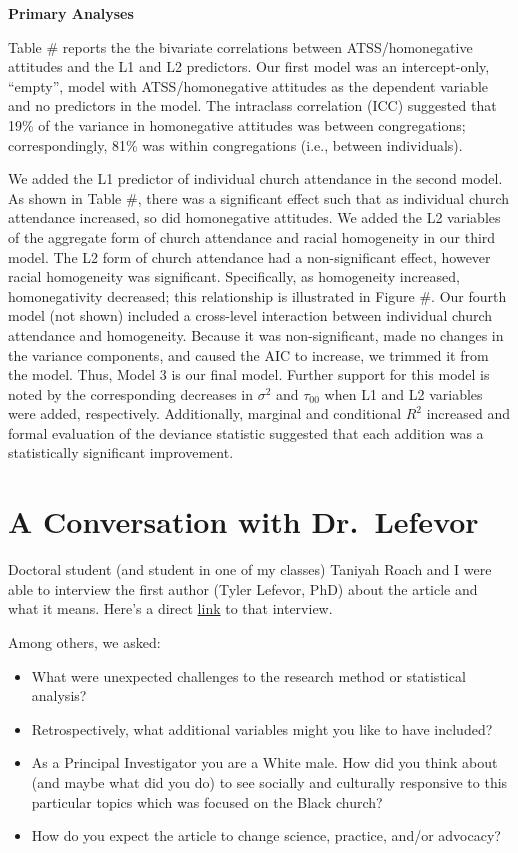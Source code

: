 \documentclass[
  11pt,
]{book}
\providecommand{\tightlist}{%
  \setlength{\itemsep}{0pt}\setlength{\parskip}{0pt}}
\begin{document}
\textbf{Primary Analyses}

Table \# reports the the bivariate correlations between ATSS/homonegative attitudes and the L1 and L2 predictors. Our first model was an intercept-only, ``empty'', model with ATSS/homonegative attitudes as the dependent variable and no predictors in the model. The intraclass correlation (ICC) suggested that 19\% of the variance in homonegative attitudes was between congregations; correspondingly, 81\% was within congregations (i.e., between individuals).

We added the L1 predictor of individual church attendance in the second model. As shown in Table \#, there was a significant effect such that as individual church attendance increased, so did homonegative attitudes. We added the L2 variables of the aggregate form of church attendance and racial homogeneity in our third model. The L2 form of church attendance had a non-significant effect, however racial homogeneity was significant. Specifically, as homogeneity increased, homonegativity decreased; this relationship is illustrated in Figure \#. Our fourth model (not shown) included a cross-level interaction between individual church attendance and homogeneity. Because it was non-significant, made no changes in the variance components, and caused the AIC to increase, we trimmed it from the model. Thus, Model 3 is our final model. Further support for this model is noted by the corresponding decreases in \(\sigma^{2}\) and \(\tau _{00}\) when L1 and L2 variables were added, respectively. Additionally, marginal and conditional \(R^2\) increased and formal evaluation of the deviance statistic suggested that each addition was a statistically significant improvement.

\hypertarget{a-conversation-with-dr.-lefevor}{%
\section{A Conversation with Dr.~Lefevor}\label{a-conversation-with-dr.-lefevor}}

Doctoral student (and student in one of my classes) Taniyah Roach and I were able to interview the first author (Tyler Lefevor, PhD) about the article and what it means. Here's a direct \href{https://spu.hosted.panopto.com/Panopto/Pages/Viewer.aspx?id=c13bb0e0-8b69-41ab-b53d-aeb001440ea7}{link} to that interview.

Among others, we asked:

\begin{itemize}
\tightlist
\item
  What were unexpected challenges to the research method or statistical analysis?
\item
  Retrospectively, what additional variables might you like to have included?
\item
  As a Principal Investigator you are a White male. How did you think about (and maybe what did you do) to see socially and culturally responsive to this particular topics which was focused on the Black church?
\item
  How do you expect the article to change science, practice, and/or advocacy?
\end{itemize}
\end{document}
